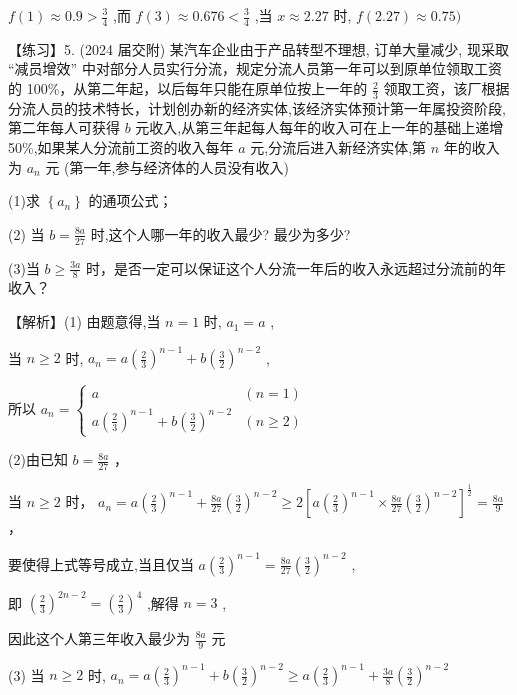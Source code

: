 \documentclass[10pt]{article}
\begin{document}
\(f\left( 1\right)  \approx  {0.9} > \frac{3}{4}\) ,而 \(f\left( 3\right)  \approx  {0.676} < \frac{3}{4}\) ,当 \(x \approx  {2.27}\) 时, \(f\left( {2.27}\right)  \approx  {0.75})\)

【练习】5. (2024 届交附) 某汽车企业由于产品转型不理想, 订单大量减少, 现采取 “减员增效” 中对部分人员实行分流，规定分流人员第一年可以到原单位领取工资的 100\%，从第二年起，以后每年只能在原单位按上一年的 \(\frac{2}{3}\) 领取工资，该厂根据分流人员的技术特长，计划创办新的经济实体,该经济实体预计第一年属投资阶段,第二年每人可获得 \(b\) 元收入,从第三年起每人每年的收入可在上一年的基础上递增 50\%,如果某人分流前工资的收入每年 \(a\) 元,分流后进入新经济实体,第 \(n\) 年的收入为 \({a}_{n}\) 元 (第一年,参与经济体的人员没有收入)

(1)求 \(\left\{  {a}_{n}\right\}\) 的通项公式；

(2) 当 \(b = \frac{8a}{27}\) 时,这个人哪一年的收入最少? 最少为多少?

(3)当 \(b \geq  \frac{3a}{8}\) 时，是否一定可以保证这个人分流一年后的收入永远超过分流前的年收入？

【解析】(1) 由题意得,当 \(n = 1\) 时, \({a}_{1} = a\) ,

当 \(n \geq  2\) 时, \({a}_{n} = a{\left( \frac{2}{3}\right) }^{n - 1} + b{\left( \frac{3}{2}\right) }^{n - 2}\) ,

所以 \({a}_{n} = \left\{  \begin{array}{ll} a & \left( {n = 1}\right) \\  a{\left( \frac{2}{3}\right) }^{n - 1} + b{\left( \frac{3}{2}\right) }^{n - 2} & \left( {n \geq  2}\right)  \end{array}\right.\)

(2)由已知 \(b = \frac{8a}{27}\) ，

当 \(n \geq  2\) 时， \({a}_{n} = a{\left( \frac{2}{3}\right) }^{n - 1} + \frac{8a}{27}{\left( \frac{3}{2}\right) }^{n - 2} \geq  2{\left\lbrack  a{\left( \frac{2}{3}\right) }^{n - 1} \times  \frac{8a}{27}{\left( \frac{3}{2}\right) }^{n - 2}\right\rbrack  }^{\frac{1}{2}} = \frac{8a}{9}\) ，

要使得上式等号成立,当且仅当 \(a{\left( \frac{2}{3}\right) }^{n - 1} = \frac{8a}{27}{\left( \frac{3}{2}\right) }^{n - 2}\) ,

即 \({\left( \frac{2}{3}\right) }^{{2n} - 2} = {\left( \frac{2}{3}\right) }^{4}\) ,解得 \(n = 3\) ,

因此这个人第三年收入最少为 \(\frac{8a}{9}\) 元

(3) 当 \(n \geq  2\) 时, \({a}_{n} = a{\left( \frac{2}{3}\right) }^{n - 1} + b{\left( \frac{3}{2}\right) }^{n - 2} \geq  a{\left( \frac{2}{3}\right) }^{n - 1} + \frac{3a}{8}{\left( \frac{3}{2}\right) }^{n - 2}\)
\end{document}
